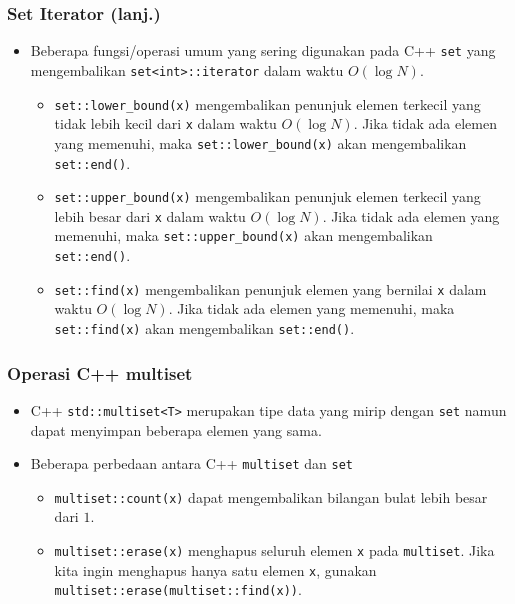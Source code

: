 \begin{frame}
\frametitle{Set Iterator (lanj.)}
\begin{itemize}
  \item Beberapa fungsi/operasi umum yang sering digunakan pada C++ \lstinline{set} yang mengembalikan \lstinline{set<int>::iterator} dalam waktu $O(\log N)$.
  \begin{itemize}
    \item \lstinline{set::lower_bound(x)} mengembalikan penunjuk elemen terkecil yang tidak lebih kecil dari \lstinline{x} dalam waktu $O(\log N)$. Jika tidak ada elemen yang memenuhi, maka \lstinline{set::lower_bound(x)} akan mengembalikan \lstinline{set::end()}.
    \item \lstinline{set::upper_bound(x)} mengembalikan penunjuk elemen terkecil yang lebih besar dari \lstinline{x} dalam waktu $O(\log N)$. Jika tidak ada elemen yang memenuhi, maka \lstinline{set::upper_bound(x)} akan mengembalikan \lstinline{set::end()}.
    \item \lstinline{set::find(x)} mengembalikan penunjuk elemen yang bernilai \lstinline{x} dalam waktu $O(\log N)$. Jika tidak ada elemen yang memenuhi, maka \lstinline{set::find(x)} akan mengembalikan \lstinline{set::end()}.
  \end{itemize}
\end{itemize}
\end{frame}

\begin{frame}
\frametitle{Operasi C++ multiset}
\begin{itemize}
  \item C++ \lstinline{std::multiset<T>} merupakan tipe data yang mirip dengan \lstinline{set} namun dapat menyimpan beberapa elemen yang sama.
  \item Beberapa perbedaan antara C++ \lstinline{multiset} dan \lstinline{set}
  \begin{itemize}
    \item \lstinline{multiset::count(x)} dapat mengembalikan bilangan bulat lebih besar dari $1$.
    \item \lstinline{multiset::erase(x)} menghapus seluruh elemen \lstinline{x} pada \lstinline{multiset}. Jika kita ingin menghapus hanya satu elemen \lstinline{x}, gunakan \lstinline{multiset::erase(multiset::find(x))}.
  \end{itemize}
\end{itemize}
\end{frame}

